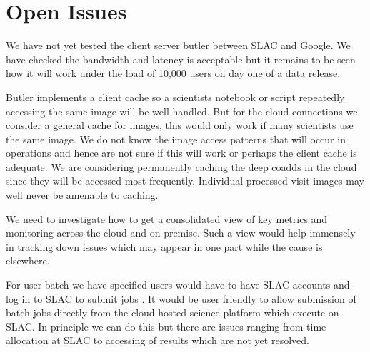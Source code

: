 \section{Open Issues} \label{sec:open}

We have not yet tested the client server butler between SLAC and Google.
We have checked the bandwidth and latency is acceptable but it remains to be seen how it will work under the load of 10,000 users on day one of a data release.

Butler implements a client cache  so a scientists notebook or script  repeatedly accessing the same image will be well handled.
But for the cloud connections we consider a general cache for images,  this would only work if many scientists use the same image.
We do not know the image access patterns that will occur in operations and hence are not sure if this will work or perhaps the client cache is adequate.
We are considering permanently caching the deep coadds in the cloud since they will be accessed most frequently.
Individual processed visit images may well never be amenable to caching.

We need to investigate how to get a  consolidated view of key metrics and monitoring across the cloud and on-premise.
Such a view would help immensely in tracking down issues which may appear in one part while the cause is elsewhere.

For user batch we have specified users would have to have SLAC accounts and log in to SLAC to submit jobs \cite{DMTN-223}.
It would be user friendly to allow submission of batch jobs directly from the cloud hosted science platform which execute on SLAC.
In principle we can do this but there are issues ranging from time allocation at SLAC to accessing of results which are not yet resolved.
